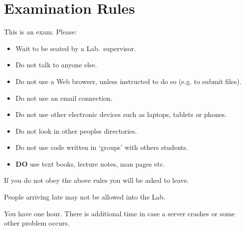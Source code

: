 \section*{Examination Rules}
This is an exam. Please:
\begin{itemize}
\item Wait to be seated by a Lab.\ supervisor.
\item Do not talk to anyone else.
\item Do not use a Web browser, unless instructed to do so (e.g. to submit files).
\item Do not use an email connection.
\item Do not use other electronic devices such as laptops, tablets or phones.
\item Do not look in other peoples directories.
\item Do not use code written in `groups' with others students.
\item {\bf DO} use text books, lecture notes, man pages etc.
\end{itemize}
If you do not obey the above rules you will be asked to leave.

People arriving late may not be allowed into the Lab.

You have one hour. There is additional time in case a
server crashes or some other problem occurs.
